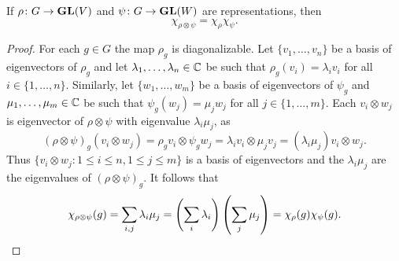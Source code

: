 \begin{proposition}
  	If $\rho\colon G\to\mathbf{GL}(V)$ and
    $\psi\colon G\to\mathbf{GL}(W)$ are representations, then
    \[
    \chi_{\rho\otimes\psi}=\chi_\rho\chi_\psi.
    \]
\end{proposition}

\begin{proof}
	For each $g\in G$ the map $\rho_g$ is diagonalizable. Let $\{v_1,\dots,v_n\}$
	be a basis of eigenvectors of $\rho_g$ and let $\lambda_1,\dots,\lambda_n\in\mathbb{C}$ be such that
	$\rho_g(v_i)=\lambda_iv_i$ for all $i\in\{1,\dots,n\}$. Similarly, 
	let $\{w_1,\dots,w_m\}$ be a basis of 
	eigenvectors of $\psi_g$ and $\mu_1,\dots,\mu_m\in\mathbb{C}$ be such that $\psi_g(w_j)=\mu_jw_j$ for all $j\in\{1,\dots,m\}$. Each 
	$v_i\otimes w_j$ is eigenvector of $\rho\otimes\psi$ with eigenvalue 
	$\lambda_i\mu_j$, as  
	\[
		(\rho\otimes\psi)_g(v_i\otimes w_j)=\rho_gv_i\otimes \psi_gw_j=\lambda_iv_i\otimes \mu_jv_j=(\lambda_i\mu_j)v_i\otimes w_j.
	\]
	Thus  
	$\{v_i\otimes w_j:1\leq i\leq n,1\leq j\leq m\}$ is a basis of eigenvectors and the 
	$\lambda_i\mu_j$ are the eigenvalues of $(\rho\otimes\psi)_g$. It follows that 
	\[
	\chi_{\rho\otimes\psi}(g)
	=\sum_{i,j}\lambda_i\mu_j
	=\left(\sum_i\lambda_i\right)\left(\sum_j\mu_j\right)
	=\chi_\rho(g)\chi_\psi(g).\qedhere 
	\]
\end{proof}

